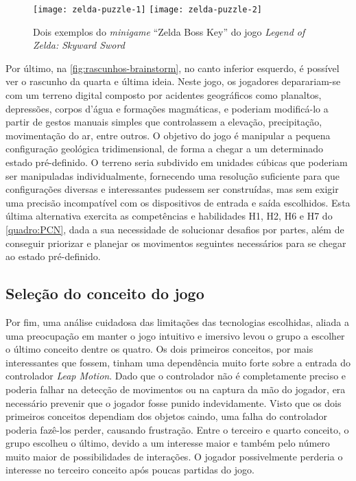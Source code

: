 \begin{figure}[h]
	\centering
	\caption{Dois exemplos do \textit{minigame} ``Zelda Boss Key'' do jogo \textit{Legend of Zelda: Skyward Sword}}
	\texttt{[image: zelda-puzzle-1]}
	\texttt{[image: zelda-puzzle-2]}
	\label{fig:zelda-key-puzzle}
\end{figure}

Por último, na \autoref{fig:rascunhos-brainstorm}, no canto inferior esquerdo,
é possível ver o rascunho da quarta e última ideia. Neste jogo, os 
jogadores deparariam-se com um terreno digital composto por acidentes
geográficos como planaltos, depressões, corpos d'água e formações magmáticas, 
e poderiam modificá-lo a partir de gestos manuais simples que controlassem 
a elevação, precipitação, movimentação do ar, entre outros. O objetivo do jogo
é manipular a pequena configuração geológica tridimensional, de forma a chegar 
a um determinado estado pré-definido. O terreno seria subdivido em unidades 
cúbicas que poderiam ser manipuladas individualmente, fornecendo uma 
resolução suficiente para que configurações diversas e interessantes pudessem 
ser construídas, mas sem exigir uma precisão incompatível com os dispositivos 
de entrada e saída escolhidos. Esta última alternativa exercita as 
competências e habilidades H1, H2, H6 e H7 do \autoref{quadro:PCN}, dada 
a sua necessidade de solucionar desafios por partes, além de conseguir priorizar e
planejar os movimentos seguintes necessários para se chegar ao estado
pré-definido.

\subsection{Seleção do conceito do jogo}\label{subsec-selecao-conceito}

Por fim, uma análise cuidadosa das limitações das tecnologias escolhidas, aliada 
a uma preocupação em manter o jogo intuitivo e imersivo levou o grupo a 
escolher o último conceito dentre os quatro. Os dois primeiros conceitos, por 
mais interessantes que fossem, tinham uma dependência muito forte sobre a
entrada do controlador \textit{Leap Motion}. Dado que o controlador não 
é completamente preciso e poderia falhar na detecção de movimentos ou 
na captura da mão do jogador, era necessário prevenir que o jogador fosse
punido indevidamente.
Visto que os dois primeiros conceitos dependiam dos objetos caindo, 
uma falha do controlador poderia fazê-los perder, causando frustração. 
Entre o terceiro e quarto conceito, o grupo escolheu o último, devido a 
um interesse maior e também pelo número muito maior de 
possibilidades de interações. O jogador possivelmente perderia o interesse no terceiro 
conceito após poucas partidas do jogo.

